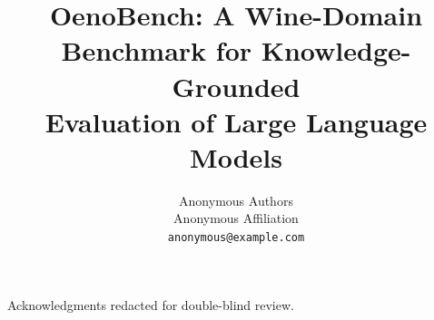 \documentclass{article}
\title{OenoBench: A Wine-Domain Benchmark for Knowledge-Grounded \\
  Evaluation of Large Language Models}
\author{%
  Anonymous Authors \\
  Anonymous Affiliation \\
  \texttt{anonymous@example.com}
}
\begin{document}
\maketitle










\begin{ack}
Acknowledgments redacted for double-blind review.
\end{ack}




\appendix







\newpage

\end{document}
